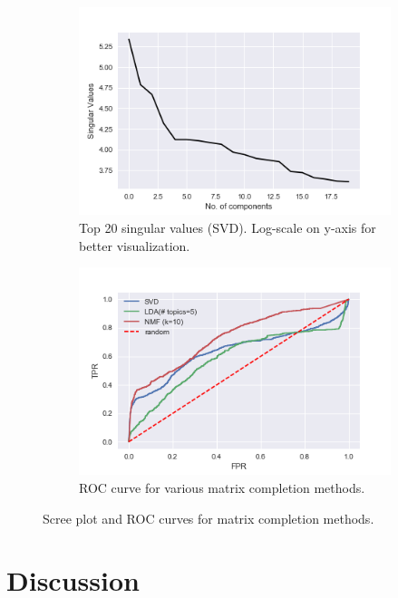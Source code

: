 \documentclass{article} %
\begin{document}
\begin{figure}
\centering
\begin{subfigure}{.5\textwidth}
    \centering
    \includegraphics[width=1\linewidth]{figures/singular_values_log_yscale}
    \caption{\small Top 20 singular values (SVD). Log-scale on y-axis for better visualization.}
    \label{fig:svd}
\end{subfigure}%
\begin{subfigure}{.5\textwidth}
    \centering
    \includegraphics[width=1\linewidth]{figures/roc}
    \caption{\small ROC curve for various matrix completion methods.}
    \label{fig:roc}
\end{subfigure}
\caption{\small Scree plot and ROC curves for matrix completion methods.}
\label{fig:test}
\end{figure}

\section{Discussion}
\end{document}
